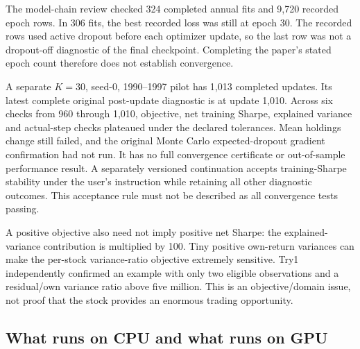 \documentclass[11pt]{article}
\begin{document}
The model-chain review checked 324 completed annual fits and 9,720
recorded epoch rows. In 306 fits, the best recorded loss was still at
epoch 30. The recorded rows used active dropout before each optimizer
update, so the last row was not a dropout-off diagnostic of the final
checkpoint. Completing the paper's stated epoch count therefore does
not establish convergence.

A separate $K=30$, seed-0, 1990--1997 pilot has 1,013 completed updates.
Its latest complete original post-update diagnostic is at update 1,010.
Across six checks from 960 through 1,010, objective, net training Sharpe,
explained variance and actual-step checks plateaued under the declared
tolerances. Mean holdings change still failed, and the original
Monte Carlo expected-dropout gradient confirmation had not run.
It has no full convergence certificate or out-of-sample performance
result. A separately versioned continuation accepts training-Sharpe
stability under the user's instruction while retaining all other
diagnostic outcomes. This acceptance rule must not be described as all
convergence tests passing.

A positive objective also need not imply positive net Sharpe: the
explained-variance contribution is multiplied by 100. Tiny positive
own-return variances can make the per-stock variance-ratio objective
extremely sensitive. Try1 independently confirmed an example with only
two eligible observations and a residual/own variance ratio above five
million. This is an objective/domain issue, not proof that the stock
provides an enormous trading opportunity.

\subsection{What runs on CPU and what runs on GPU}
\end{document}
